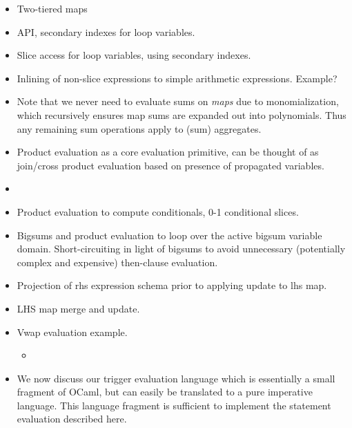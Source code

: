 
\begin{itemize}
  \item Two-tiered maps
  \item API, secondary indexes for loop variables.
\end{itemize}


\begin{itemize}
  \item Slice access for loop variables, using secondary indexes.
  \item Inlining of non-slice expressions to simple arithmetic expressions.
  Example?
  \item Note that we never need to evaluate sums on \textit{maps} due to
  monomialization, which recursively ensures map sums are expanded out into
  polynomials. Thus any remaining sum operations apply to (sum) aggregates.
  \item Product evaluation as a core evaluation primitive, can be thought of as
  join/cross product evaluation based on presence of propagated variables.
  \item {}
  \item Product evaluation to compute conditionals, 0-1 conditional slices.
  \item Bigsums and product evaluation to loop over the active bigsum variable
  domain. Short-circuiting in light of bigsums to avoid unnecessary
  (potentially complex and expensive) then-clause evaluation.
  \item Projection of rhs expression schema prior to applying update to lhs map.
  \item LHS map merge and update. 
  \item Vwap evaluation example.
  \begin{itemize}
    \item {}
  \end{itemize}
  
  \item We now discuss our trigger evaluation language which is essentially a
  small fragment of OCaml, but can easily be translated to a pure imperative language. This language
  fragment is sufficient to implement the statement evaluation described here.
\end{itemize}

